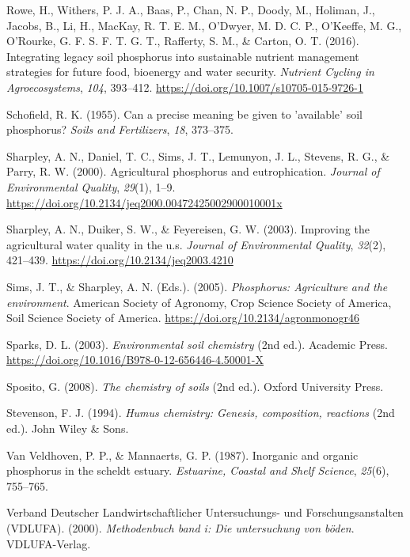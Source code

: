\documentclass[
  a4paper,
]{article}
\newlength{\cslhangindent}
\newenvironment{CSLReferences}[2] %
 {\begin{list}{}{%
  \setlength{\itemindent}{0pt}
  \setlength{\leftmargin}{0pt}
  \setlength{\parsep}{0pt}
  \ifodd #1
   \setlength{\leftmargin}{\cslhangindent}
   \setlength{\itemindent}{-1\cslhangindent}
  \fi
  \setlength{\itemsep}{#2\baselineskip}}}
 {\end{list}}
\begin{document}
\begin{CSLReferences}{1}{0}
Rowe, H., Withers, P. J. A., Baas, P., Chan, N. P., Doody, M., Holiman,
J., Jacobs, B., Li, H., MacKay, R. T. E. M., O'Dwyer, M. D. C. P.,
O'Keeffe, M. G., O'Rourke, G. F. S. F. T. G. T., Rafferty, S. M., \&
Carton, O. T. (2016). Integrating legacy soil phosphorus into
sustainable nutrient management strategies for future food, bioenergy
and water security. \emph{Nutrient Cycling in Agroecosystems},
\emph{104}, 393--412. \url{https://doi.org/10.1007/s10705-015-9726-1}

Schofield, R. K. (1955). Can a precise meaning be given to 'available'
soil phosphorus? \emph{Soils and Fertilizers}, \emph{18}, 373--375.

Sharpley, A. N., Daniel, T. C., Sims, J. T., Lemunyon, J. L., Stevens,
R. G., \& Parry, R. W. (2000). Agricultural phosphorus and
eutrophication. \emph{Journal of Environmental Quality}, \emph{29}(1),
1--9. \url{https://doi.org/10.2134/jeq2000.00472425002900010001x}

Sharpley, A. N., Duiker, S. W., \& Feyereisen, G. W. (2003). Improving
the agricultural water quality in the u.s. \emph{Journal of
Environmental Quality}, \emph{32}(2), 421--439.
\url{https://doi.org/10.2134/jeq2003.4210}

Sims, J. T., \& Sharpley, A. N. (Eds.). (2005). \emph{Phosphorus:
Agriculture and the environment}. American Society of Agronomy, Crop
Science Society of America, Soil Science Society of America.
\url{https://doi.org/10.2134/agronmonogr46}

Sparks, D. L. (2003). \emph{Environmental soil chemistry} (2nd ed.).
Academic Press. \url{https://doi.org/10.1016/B978-0-12-656446-4.50001-X}

Sposito, G. (2008). \emph{The chemistry of soils} (2nd ed.). Oxford
University Press.

Stevenson, F. J. (1994). \emph{Humus chemistry: Genesis, composition,
reactions} (2nd ed.). John Wiley \& Sons.

Van Veldhoven, P. P., \& Mannaerts, G. P. (1987). Inorganic and organic
phosphorus in the scheldt estuary. \emph{Estuarine, Coastal and Shelf
Science}, \emph{25}(6), 755--765.

Verband Deutscher Landwirtschaftlicher Untersuchungs- und
Forschungsanstalten (VDLUFA). (2000). \emph{Methodenbuch band i: Die
untersuchung von böden}. VDLUFA-Verlag.

\end{CSLReferences}
\end{document}
